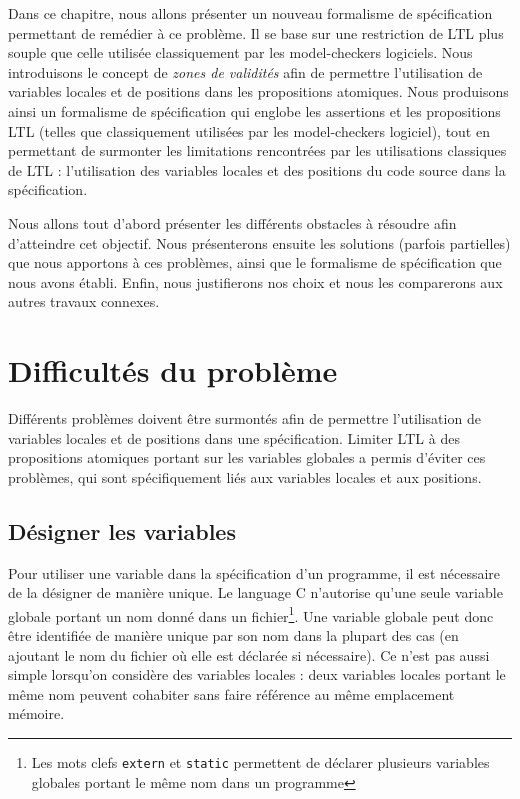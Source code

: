 Dans ce chapitre, nous allons présenter un nouveau formalisme de spécification
permettant de remédier à ce problème. Il se base sur une restriction de \ac{LTL}
plus souple que celle utilisée classiquement par les model-checkers logiciels.
Nous introduisons le concept de \emph{zones de validités} afin de permettre
l'utilisation de variables locales et de positions dans les propositions
atomiques. Nous produisons ainsi un formalisme de spécification qui englobe les
assertions et les propositions LTL (telles que classiquement utilisées par les
model-checkers logiciel), tout en permettant de surmonter les limitations
rencontrées par les utilisations classiques de LTL : l'utilisation des variables
locales et des positions du code source dans la spécification.

Nous allons tout d'abord présenter les différents obstacles à résoudre afin
d'atteindre cet objectif. Nous présenterons ensuite les solutions (parfois partielles)
que nous apportons à ces problèmes, ainsi que le formalisme de spécification que
nous avons établi. Enfin, nous justifierons nos choix et nous les comparerons
aux autres travaux connexes.

\section{Difficultés du problème}

Différents problèmes doivent être surmontés afin de permettre l'utilisation de
variables locales et de positions dans une spécification.
Limiter \ac{LTL} à des propositions atomiques portant sur les variables globales
a permis d'éviter ces problèmes, qui sont spécifiquement liés aux variables
locales et aux positions.

\subsection{Désigner les variables}

Pour utiliser une variable dans la spécification d'un programme, il est
nécessaire de la désigner de manière unique.
Le language C n'autorise qu'une seule variable globale portant un nom
donné dans un fichier\footnote{Les mots clefs \texttt{extern} et
\texttt{static} permettent de déclarer plusieurs variables globales
portant le même nom dans un programme}. Une variable globale peut donc être
identifiée de manière unique par son nom dans la plupart des cas (en ajoutant le
nom du fichier où elle est déclarée si nécessaire). Ce n'est pas
aussi simple lorsqu'on considère des variables locales : deux variables
locales portant le même nom peuvent cohabiter sans faire référence au
même emplacement mémoire.

